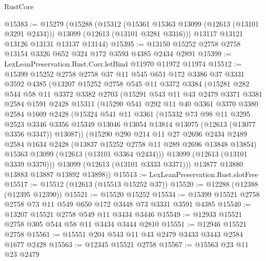 \begin{lexlean}{RustCore}
\begin{coremodule}
@15383 := @15279
    (@15288
      (@15312
        (@15361 @15363 @13099 (@12613 (@13101 @3291 @2434)))
        @13099
        (@12613 (@13101 @3281 @3316)))
      @13117
      @13121
      @13126
      @13131
      @13137
      @13144)
@15395 := @13150 @15252 @2758 @2758 @13154 @3326 @652 @324 @172 @3593 @4385 @2434 @2891
@15399 := LexLeanPreservation.Rust.Corr.letBind @11970 @11972 @11974
@15512 := @15399
    @15252
    @2758
    @2758
    @37
    @11
    @545
    @651
    @172
    @3386
    @37
    @3331
    @3592
    @4385
    (@13207
      @15252
      @2758
      @545
      @11
      @3372
      @3384
      (@15281
        @282
        @544
        @58
        @11
        @3372
        @3382
        @2703
        (@15291
          @543
          @11
          @43
          @2479
          @3371
          @3381
          @2584
          @1591
          @2428
          @15311
          (@15290
            @541
            @292
            @11
            @40
            @3361
            @3370
            @3380
            @2584
            @1609
            @2428
            (@15324
              @541
              @11
              @3361
              (@15332
                @73
                @98
                @11
                @3295
                @2523
                @3346
                @3356
                @15349
                @13046
                @13054
                @13814
                @13075
                (@12613 (@13077 @3356 @3347))
                @13087))
            (@15290
              @290
              @214
              @11
              @27
              @2696
              @2434
              @2489
              @2584
              @1634
              @2428
              (@13837 @15252 @2758 @11 @289 @2696 @13848 @13854)
              @15363
              @13099
              (@12613 (@13101 @3364 @2434)))
            @13099
            (@12613 (@13101 @3339 @3370)))
          @13099
          (@12613 (@13101 @3333 @3371)))
        @13877
        @13880
        @13883
        @13887
        @13892
        @13898))
@15513 := LexLeanPreservation.Rust.slotFree
@15517 := @15512 (@12613 (@15513 @15252 @37))
@15520 := @12288 (@12388 (@12395 @12390))
@15521 := @15520 @15252
@15534 := @15399 @15521 @2758 @2758 @73 @11 @549 @650 @172 @3448 @73 @3331 @3591 @4385
@15540 := @13207 @15521 @2758 @549 @11 @3434 @3446
@15549 := @12933 @15521 @2758 @305 @544 @58 @11 @3434 @3444 @2810
@15551 := @12946 @15521 @2758
@15561 := @15551 @204 @543 @11 @43 @2479 @3433 @3443 @2584 @1677 @2428
@15563 := @12345 @15521 @2758
@15567 := @15563 @23 @11 @23 @2479

\end{coremodule}
\end{lexlean}
